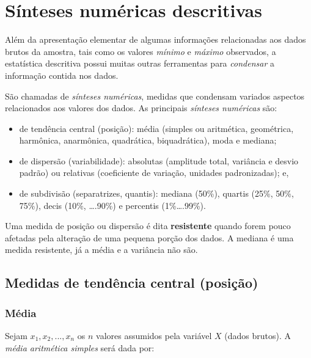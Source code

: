 \documentclass[
]{book}
\providecommand{\tightlist}{%
  \setlength{\itemsep}{0pt}\setlength{\parskip}{0pt}}
\begin{document}
\hypertarget{suxednteses-numuxe9ricas-descritivas}{%
\section{Sínteses numéricas descritivas}\label{suxednteses-numuxe9ricas-descritivas}}

Além da apresentação elementar de algumas informações relacionadas aos dados brutos da amostra, tais como os valores \emph{mínimo} e \emph{máximo} observados, a estatística descritiva possui muitas outras ferramentas para \emph{condensar} a informação contida nos dados.

São chamadas de \emph{sínteses numéricas}, medidas que condensam variados aspectos relacionados aos valores dos dados. As principais \emph{sínteses numéricas} são:

\begin{itemize}
\tightlist
\item
  de tendência central (posição): média (simples ou aritmética, geométrica, harmônica, anarmônica, quadrática, biquadrática), moda e mediana;
\item
  de dispersão (variabilidade): absolutas (amplitude total, variância e desvio padrão) ou relativas (coeficiente de variação, unidades padronizadas); e,
\item
  de subdivisão (separatrizes, quantis): mediana (50\%), quartis (25\%, 50\%, 75\%), decis (10\%, \ldots.90\%) e percentis (1\%\ldots.99\%).
\end{itemize}

Uma medida de posição ou dispersão é dita \textbf{resistente} quando forem pouco afetadas pela alteração de uma pequena porção dos dados. A mediana é uma medida resistente, já a média e a variância não são.

\hypertarget{medidas-de-tenduxeancia-central-posiuxe7uxe3o}{%
\subsection{Medidas de tendência central (posição)}\label{medidas-de-tenduxeancia-central-posiuxe7uxe3o}}

\hypertarget{muxe9dia}{%
\subsubsection{Média}\label{muxe9dia}}

Sejam \(x_{1}, x_{2}, ..., x_{n}\) os \(n\) valores assumidos pela variável \(X\) (dados brutos). A \emph{média aritmética simples} será dada por:
\end{document}
